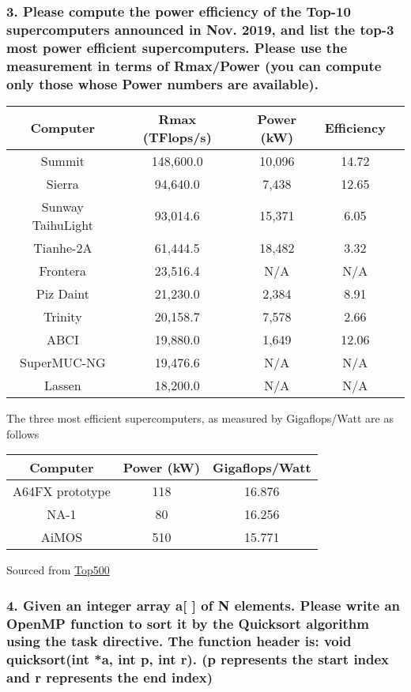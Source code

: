 \documentclass[titlepage]{article}
\begin{document}
\subsubsection*{3. Please compute the power efficiency of the Top-10 supercomputers announced in
Nov. 2019, and list the top-3 most power efficient supercomputers. Please use the
measurement in terms of Rmax/Power (you can compute only those whose Power
numbers are available).}
\begin{center}
    \begin{tabular}{ |c|c|c|c|c| } 
     \hline
     Computer & Rmax (TFlops/s) & Power (kW) & Efficiency\\ 
     \hline
        Summit & 148,600.0 & 10,096 & 14.72\\ 
        Sierra & 94,640.0 & 7,438 & 12.65\\
        Sunway TaihuLight & 93,014.6 & 15,371 & 6.05\\
        Tianhe-2A & 61,444.5 & 18,482 & 3.32\\
        Frontera & 23,516.4 & N/A & N/A \\
        Piz Daint & 21,230.0 & 2,384 & 8.91 \\
        Trinity & 20,158.7 & 7,578 & 2.66\\
        ABCI & 19,880.0 & 1,649 & 12.06\\
        SuperMUC-NG & 19,476.6 & N/A & N/A \\
        Lassen & 18,200.0 & N/A & N/A\\    
     \hline
    \end{tabular}
\end{center}
The three most efficient supercomputers, as measured by Gigaflops/Watt are as follows
\begin{center}
    \begin{tabular}{ |c|c|c| } 
     \hline
     Computer & Power (kW) & Gigaflops/Watt\\ 
     \hline
        A64FX prototype & 118 & 16.876 \\
        NA-1 & 80 & 16.256 \\
        AiMOS & 510 & 15.771 \\
     \hline
    \end{tabular}
\end{center}
Sourced from \href{https://www.top500.org/green500/list/2019/11/}{Top500}
\subsubsection*{4. Given an integer array a[ ] of N elements. Please write an OpenMP function to sort it
by the Quicksort algorithm using the task directive. The function header is: void
quicksort(int *a, int p, int r). (p represents the start index and r
represents the end index)}
\end{document}
